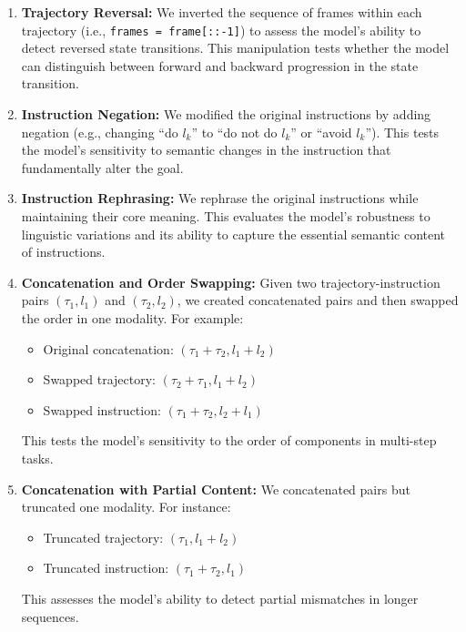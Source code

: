 \documentclass{article}
\theoremstyle{plain}
\theoremstyle{definition}
\theoremstyle{remark}
\begin{document}
\begin{enumerate}
    \item \textbf{Trajectory Reversal:} We inverted the sequence of frames within each trajectory (i.e., \texttt{frames = frame[::-1]}) to assess the model's ability to detect reversed state transitions. This manipulation tests whether the model can distinguish between forward and backward progression in the state transition.
    \item \textbf{Instruction Negation:} We modified the original instructions by adding negation (e.g., changing ``do $l_k$'' to ``do not do $l_k$'' or ``avoid $l_k$''). This tests the model's sensitivity to semantic changes in the instruction that fundamentally alter the goal.

    \item \textbf{Instruction Rephrasing:} We rephrase the original instructions while maintaining their core meaning. This evaluates the model's robustness to linguistic variations and its ability to capture the essential semantic content of instructions.
    
    \item \textbf{Concatenation and Order Swapping:} Given two trajectory-instruction pairs $(\tau_1, l_1)$ and $(\tau_2, l_2)$, we created concatenated pairs and then swapped the order in one modality. For example:
        \begin{itemize}
            \item Original concatenation: $(\tau_1 + \tau_2, l_1 + l_2)$
            \item Swapped trajectory: $(\tau_2 + \tau_1, l_1 + l_2)$
            \item Swapped instruction: $(\tau_1 + \tau_2, l_2 + l_1)$
        \end{itemize}
        This tests the model's sensitivity to the order of components in multi-step tasks.
    
    \item \textbf{Concatenation with Partial Content:} We concatenated pairs but truncated one modality. For instance:
        \begin{itemize}
            \item Truncated trajectory: $(\tau_1, l_1 + l_2)$
            \item Truncated instruction: $(\tau_1 + \tau_2, l_1)$
        \end{itemize}
        This assesses the model's ability to detect partial mismatches in longer sequences.
    
\end{enumerate}
\end{document}
